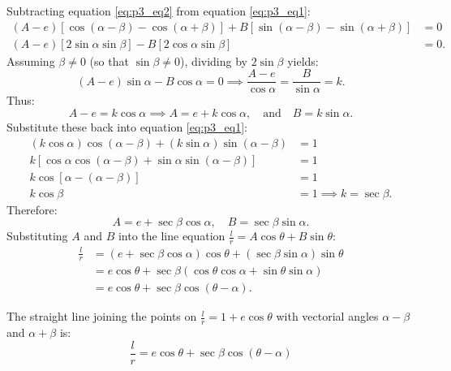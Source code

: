 Subtracting equation \eqref{eq:p3_eq2} from equation \eqref{eq:p3_eq1}:
\begin{align}
    (A - e)[\cos(\alpha - \beta) - \cos(\alpha + \beta)] + B[\sin(\alpha - \beta) - \sin(\alpha + \beta)] &= 0 \nonumber\\
    (A - e)[2\sin\alpha\sin\beta] - B[2\cos\alpha\sin\beta] &= 0.
\end{align}
Assuming $\beta \neq 0$ (so that $\sin\beta \neq 0$), dividing by $2\sin\beta$ yields:
\begin{equation}
    (A - e)\sin\alpha - B\cos\alpha = 0 \implies \frac{A - e}{\cos\alpha} = \frac{B}{\sin\alpha} = k.
\end{equation}
Thus:
\begin{equation}
    A - e = k\cos\alpha \implies A = e + k\cos\alpha, \quad \text{and} \quad B = k\sin\alpha.
\end{equation}
Substitute these back into equation \eqref{eq:p3_eq1}:
\begin{align}
    (k\cos\alpha)\cos(\alpha - \beta) + (k\sin\alpha)\sin(\alpha - \beta) &= 1 \nonumber\\
    k[\cos\alpha\cos(\alpha - \beta) + \sin\alpha\sin(\alpha - \beta)] &= 1 \nonumber\\
    k\cos[\alpha - (\alpha - \beta)] &= 1 \nonumber\\
    k\cos\beta &= 1 \implies k = \sec\beta.
\end{align}
Therefore:
\begin{equation}
    A = e + \sec\beta\cos\alpha, \quad B = \sec\beta\sin\alpha.
\end{equation}
Substituting $A$ and $B$ into the line equation $\frac{l}{r} = A\cos\theta + B\sin\theta$:
\begin{align}
    \frac{l}{r} &= (e + \sec\beta\cos\alpha)\cos\theta + (\sec\beta\sin\alpha)\sin\theta \nonumber\\
    &= e\cos\theta + \sec\beta(\cos\theta\cos\alpha + \sin\theta\sin\alpha) \nonumber\\
    &= e\cos\theta + \sec\beta\cos(\theta - \alpha).
\end{align}

\begin{theorembox}
The straight line joining the points on $\frac{l}{r} = 1 + e\cos\theta$ with vectorial angles $\alpha - \beta$ and $\alpha + \beta$ is:
\begin{equation}
    \boxed{\frac{l}{r} = e\cos\theta + \sec\beta\cos(\theta - \alpha)}
\end{equation}
\end{theorembox}

